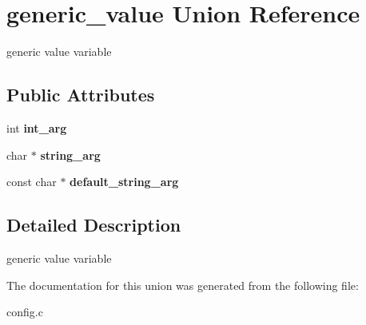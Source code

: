 \hypertarget{uniongeneric__value}{}\section{generic\+\_\+value Union Reference}
\label{uniongeneric__value}


generic value variable  


\subsection*{Public Attributes}
\begin{DoxyCompactItemize}
\item 
\hypertarget{uniongeneric__value_a81595135efdffcb0e5d0d0c94239cd89}{}int {\bfseries int\+\_\+arg}\label{uniongeneric__value_a81595135efdffcb0e5d0d0c94239cd89}

\item 
\hypertarget{uniongeneric__value_a0cdfd35c5866b0df252896c4ab9768be}{}char $\ast$ {\bfseries string\+\_\+arg}\label{uniongeneric__value_a0cdfd35c5866b0df252896c4ab9768be}

\item 
\hypertarget{uniongeneric__value_ab84e5a651b5d6d0126c95cd763ac7863}{}const char $\ast$ {\bfseries default\+\_\+string\+\_\+arg}\label{uniongeneric__value_ab84e5a651b5d6d0126c95cd763ac7863}

\end{DoxyCompactItemize}


\subsection{Detailed Description}
generic value variable 

The documentation for this union was generated from the following file\+:\begin{DoxyCompactItemize}
\item 
config.\+c\end{DoxyCompactItemize}
